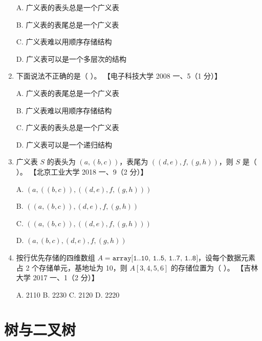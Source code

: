 \documentclass[lang=cn,newtx,10pt,scheme=chinese]{../../elegantbook}
\begin{document}
\begin{enumerate}
    A. 广义表的表头总是一个广义表  

    B. 广义表的表尾总是一个广义表  


    C. 广义表难以用顺序存储结构  

    D. 广义表可以是一个多层次的结构  

    \item 下面说法不正确的是（ ）。  
    【电子科技大学 2008 一、5（1 分）】  

    A. 广义表的表尾总是一个广义表  

    B. 广义表难以用顺序存储结构  

    C. 广义表的表头总是一个广义表  

    D. 广义表可以是一个递归结构  

    \item 广义表 $S$ 的表头为 $(a, (b, c))$，表尾为 $((d, e), f,(g, h))$，则 $S$ 是（ ）。  
    【北京工业大学 2018 一、9（2 分）】  

    A. $(a, ((b, c)), ((d, e),f, (g, h)))$  

    B. $((a, (b, c)), (d, e), f, (g, h))$  

    C. $((a, (b, c)), ((d, e), f, (g, h)))$  

    D. $(a, (b, c), (d, e), f, (g, h))$  

    \item 按行优先存储的四维数组 $A = \texttt{array[1..10, 1..5, 1..7, 1..8]}$，设每个数据元素占 2 个存储单元，基地址为 10，则 $A[3, 4, 5, 6]$ 的存储位置为（ ）。  
    【吉林大学 2017 一、1（2 分）】  

    A. 2110 \quad B. 2230 \quad C. 2120 \quad D. 2220 
\end{enumerate}

\chapter{树与二叉树}
\end{document}
